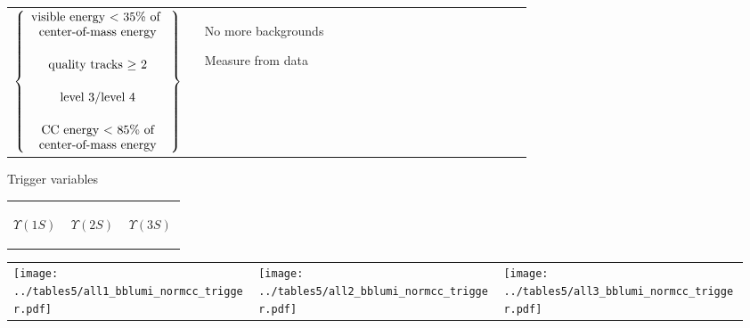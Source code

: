 \documentclass[landscape]{article}
\begin{document}
\begin{tabular}{p{0.35\linewidth} p{0.6\linewidth}}
  \begin{minipage}{\linewidth}
    $\left\{ \begin{array}{c}
      \mbox{visible energy $<$ 35\% of } \\
      \vspace{0.5 cm} \mbox{center-of-mass energy} \\
      \vspace{0.5 cm} \mbox{quality tracks $\ge$ 2} \\
      \vspace{0.5 cm} \mbox{level 3/level 4} \\
      \mbox{CC energy $<$ 85\% of} \\
      \mbox{center-of-mass energy} \\
    \end{array} \right\}$
  \end{minipage} &
  \begin{minipage}{\linewidth}
    No more backgrounds

    \vspace{1 cm}
    Measure from data
  \end{minipage} \\

\end{tabular}

\pagebreak

Trigger variables

\vspace{-1.75 cm}
\begin{center}
  \begin{tabular}{p{0.32\linewidth} p{0.32\linewidth} p{0.32\linewidth}}
    \begin{center} $\Upsilon(1S)$ \end{center} & \begin{center} $\Upsilon(2S)$ \end{center} & \begin{center} $\Upsilon(3S)$ \end{center} \\
  \end{tabular}

  \vspace{-0.75 cm}
  \begin{tabular}{p{0.32\linewidth} p{0.32\linewidth} p{0.32\linewidth}}
    \texttt{[image: ../tables5/all1\_bblumi\_normcc\_trigger.pdf]} &
    \texttt{[image: ../tables5/all2\_bblumi\_normcc\_trigger.pdf]} &
    \texttt{[image: ../tables5/all3\_bblumi\_normcc\_trigger.pdf]}
  \end{tabular}
\end{center}
\end{document}
